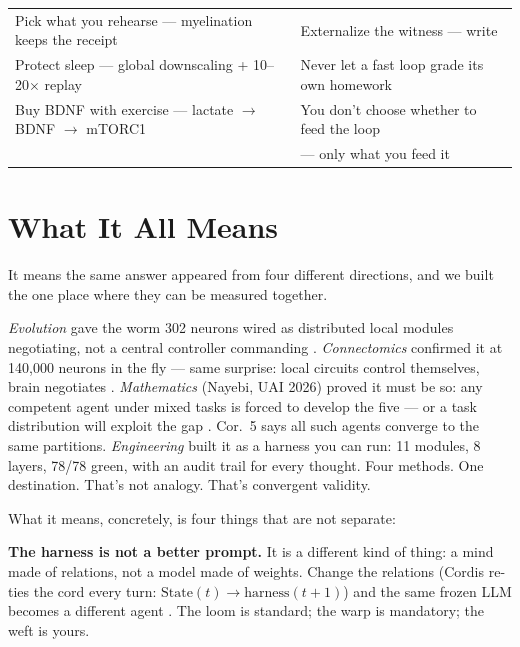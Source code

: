 \documentclass[11pt]{article}
\begin{document}
\begin{center}
\begin{tabular}{p{6cm}p{6cm}}
\toprule
Pick what you rehearse --- myelination keeps the receipt & Externalize the witness --- write \\
Protect sleep --- global downscaling + 10--20$\times$ replay & Never let a fast loop grade its own homework \\
Buy BDNF with exercise --- lactate $\to$ BDNF $\to$ mTORC1 & You don't choose whether to feed the loop \\
& --- only what you feed it \\
\bottomrule
\end{tabular}
\end{center}

\section{What It All Means}
\label{sec:what-it-all-means}

It means the same answer appeared from four different directions, and we built the one place where they can be measured together.

\textit{Evolution} gave the worm 302 neurons wired as distributed local modules negotiating, not a central controller commanding \citep{white1986}. \textit{Connectomics} confirmed it at 140,000 neurons in the fly --- same surprise: local circuits control themselves, brain negotiates \citep{dorkenwald2023}. \textit{Mathematics} (Nayebi, UAI 2026) proved it must be so: any competent agent under mixed tasks is forced to develop the five --- or a task distribution will exploit the gap \citep{nayebi2026}. Cor.~5 says all such agents converge to the same partitions. \textit{Engineering} built it as a harness you can run: 11 modules, 8 layers, 78/78 green, with an audit trail for every thought. Four methods. One destination. That's not analogy. That's convergent validity.

What it means, concretely, is four things that are not separate:

\textbf{The harness is not a better prompt.} It is a different kind of thing: a mind made of relations, not a model made of weights. Change the relations (Cordis re-ties the cord every turn: $\mathrm{State}(t) \to \mathrm{harness}(t{+}1)$) and the same frozen LLM becomes a different agent \citep{lin2026ahe}. The loom is standard; the warp is mandatory; the weft is yours.
\end{document}

